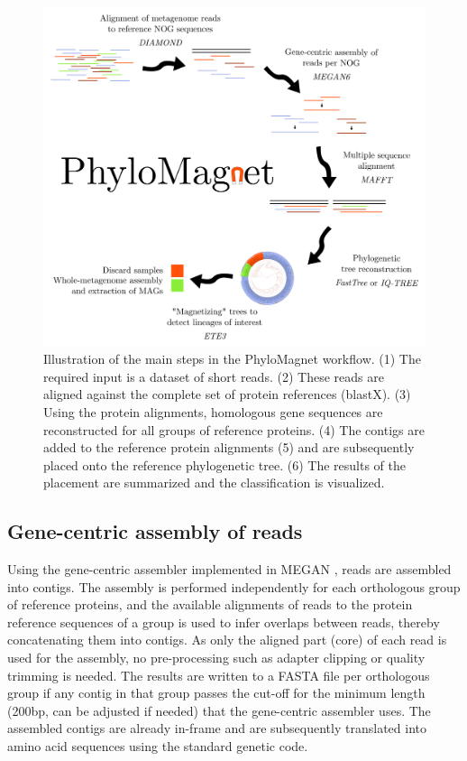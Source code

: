 \documentclass{bioinfo}
\begin{document}
\begin{methods}
\begin{figure}[!tpb]
\centerline{\includegraphics[width=.45\textwidth]{figures/Fig1.png}}
\caption{Illustration of the main steps in the PhyloMagnet workflow. (1) The required input is a dataset of short reads. (2) These reads are aligned against the complete set of protein references (blastX). (3) Using the protein alignments, homologous gene sequences are reconstructed for all groups of reference proteins. (4) The contigs are added to the reference protein alignments (5) and are subsequently placed onto the reference phylogenetic tree. (6) The results of the placement are summarized and the classification is visualized.}\label{fig:01}
\end{figure}


\subsection{Gene-centric assembly of reads}\label{gc-assembly}
Using the gene-centric assembler implemented in MEGAN \citep{Huson2016,Huson2017}, reads are assembled into contigs. The assembly is performed independently for each orthologous group of reference proteins, and the available alignments of reads to the protein reference sequences of a group is used to infer overlaps between reads, thereby concatenating them into contigs. As only the aligned part (core) of each read is used for the assembly, no pre-processing such as adapter clipping or quality trimming is needed. The results are written to a FASTA file per orthologous group if any contig in that group passes the cut-off for the minimum length (200bp, can be adjusted if needed) that the gene-centric assembler uses. The assembled contigs are already in-frame and are subsequently translated into amino acid sequences using the standard genetic code.


\end{methods}
\end{document}
